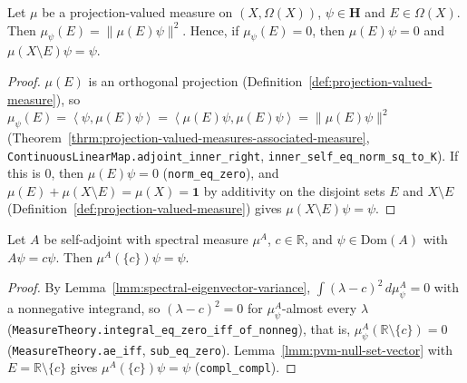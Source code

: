 \begin{lemma}
    \label{lmm:pvm-null-set-vector}
    \leanok
    Let $\mu$ be a projection-valued measure on $(X, \Omega(X))$, $\psi \in \mathbf{H}$ and $E \in \Omega(X)$. Then $\mu_\psi(E) = \|\mu(E)\psi\|^2$. Hence, if $\mu_\psi(E) = 0$, then $\mu(E)\psi = 0$ and $\mu(X \setminus E)\psi = \psi$.
\end{lemma}
\begin{proof}
    \leanok
    $\mu(E)$ is an orthogonal projection (Definition~\ref{def:projection-valued-measure}), so $\mu_\psi(E) = \left< \psi, \mu(E)\psi \right> = \left< \mu(E)\psi, \mu(E)\psi \right> = \|\mu(E)\psi\|^2$ (Theorem~\ref{thrm:projection-valued-measures-associated-measure}, \texttt{ContinuousLinearMap.adjoint\_inner\_right}, \texttt{inner\_self\_eq\_norm\_sq\_to\_K}). If this is $0$, then $\mu(E)\psi = 0$ (\texttt{norm\_eq\_zero}), and $\mu(E) + \mu(X \setminus E) = \mu(X) = \mathbf{1}$ by additivity on the disjoint sets $E$ and $X \setminus E$ (Definition~\ref{def:projection-valued-measure}) gives $\mu(X \setminus E)\psi = \psi$.
\end{proof}

\begin{lemma}
    \label{lmm:spectral-eigenvector-projection}
    \leanok
    Let $A$ be self-adjoint with spectral measure $\mu^A$, $c \in \mathbb{R}$, and $\psi \in \text{Dom}(A)$ with $A\psi = c\psi$. Then $\mu^A(\{c\})\psi = \psi$.
\end{lemma}
\begin{proof}
    \leanok
    By Lemma~\ref{lmm:spectral-eigenvector-variance}, $\int (\lambda - c)^2 \, d\mu^A_\psi = 0$ with a nonnegative integrand, so $(\lambda - c)^2 = 0$ for $\mu^A_\psi$-almost every $\lambda$ (\texttt{MeasureTheory.integral\_eq\_zero\_iff\_of\_nonneg}), that is, $\mu^A_\psi(\mathbb{R} \setminus \{c\}) = 0$ (\texttt{MeasureTheory.ae\_iff}, \texttt{sub\_eq\_zero}). Lemma~\ref{lmm:pvm-null-set-vector} with $E = \mathbb{R} \setminus \{c\}$ gives $\mu^A(\{c\})\psi = \psi$ (\texttt{compl\_compl}).
\end{proof}

